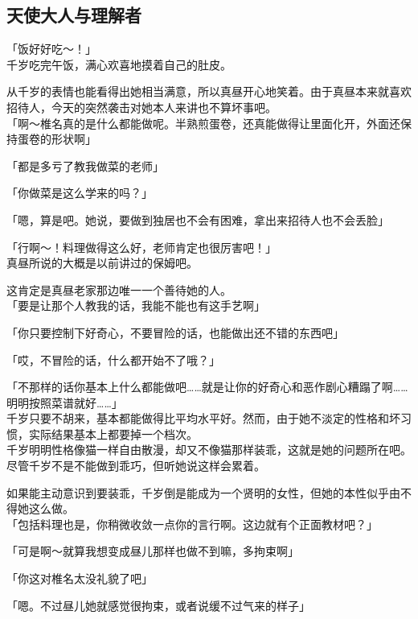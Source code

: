 \subsection{天使大人与理解者}

「饭好好吃～！」\\

千岁吃完午饭，满心欢喜地摸着自己的肚皮。

从千岁的表情也能看得出她相当满意，所以真昼开心地笑着。由于真昼本来就喜欢招待人，今天的突然袭击对她本人来讲也不算坏事吧。\\

「啊～椎名真的是什么都能做呢。半熟煎蛋卷，还真能做得让里面化开，外面还保持蛋卷的形状啊」

「都是多亏了教我做菜的老师」

「你做菜是这么学来的吗？」

「嗯，算是吧。她说，要做到独居也不会有困难，拿出来招待人也不会丢脸」

「行啊～！料理做得这么好，老师肯定也很厉害吧！」\\

真昼所说的大概是以前讲过的保姆吧。

这肯定是真昼老家那边唯一一个善待她的人。\\

「要是让那个人教我的话，我能不能也有这手艺啊」

「你只要控制下好奇心，不要冒险的话，也能做出还不错的东西吧」

「哎，不冒险的话，什么都开始不了哦？」

「不那样的话你基本上什么都能做吧……就是让你的好奇心和恶作剧心糟蹋了啊……明明按照菜谱就好……」\\

千岁只要不胡来，基本都能做得比平均水平好。然而，由于她不淡定的性格和坏习惯，实际结果基本上都要掉一个档次。\\

千岁明明性格像猫一样自由散漫，却又不像猫那样装乖，这就是她的问题所在吧。尽管千岁不是不能做到乖巧，但听她说这样会累着。

如果能主动意识到要装乖，千岁倒是能成为一个贤明的女性，但她的本性似乎由不得她这么做。\\

「包括料理也是，你稍微收敛一点你的言行啊。这边就有个正面教材吧？」

「可是啊～就算我想变成昼儿那样也做不到嘛，多拘束啊」

「你这对椎名太没礼貌了吧」

「嗯。不过昼儿她就感觉很拘束，或者说缓不过气来的样子」\\

